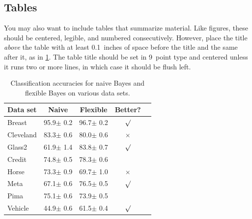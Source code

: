     \subsection{Tables}

    You may also want to include tables that summarize material. Like
    figures, these should be centered, legible, and numbered consecutively.
    However, place the title \emph{above} the table with at least
    0.1~inches of space before the title and the same after it, as in
    \cref{sample-table}. The table title should be set in 9~point
    type and centered unless it runs two or more lines, in which case it
    should be flush left.


    \begin{table}[t]
        \caption{Classification accuracies for naive Bayes and flexible Bayes on various 
                 data sets.}
        \label{sample-table}
        \vskip 0.15in
        \begin{center}
            \begin{small}
                \begin{sc}
                    \begin{tabular}{lcccr}
                        \toprule
                        Data set & Naive & Flexible & Better? \\
                        \midrule
                        Breast    & 95.9$\pm$ 0.2& 96.7$\pm$ 0.2& $\surd$ \\
                        Cleveland & 83.3$\pm$ 0.6& 80.0$\pm$ 0.6& $\times$\\
                        Glass2    & 61.9$\pm$ 1.4& 83.8$\pm$ 0.7& $\surd$ \\
                        Credit    & 74.8$\pm$ 0.5& 78.3$\pm$ 0.6&         \\
                        Horse     & 73.3$\pm$ 0.9& 69.7$\pm$ 1.0& $\times$\\
                        Meta      & 67.1$\pm$ 0.6& 76.5$\pm$ 0.5& $\surd$ \\
                        Pima      & 75.1$\pm$ 0.6& 73.9$\pm$ 0.5&         \\
                        Vehicle   & 44.9$\pm$ 0.6& 61.5$\pm$ 0.4& $\surd$ \\
                        \bottomrule
                    \end{tabular}
                \end{sc}
            \end{small}
        \end{center}
        \vskip -0.1in
    \end{table}

